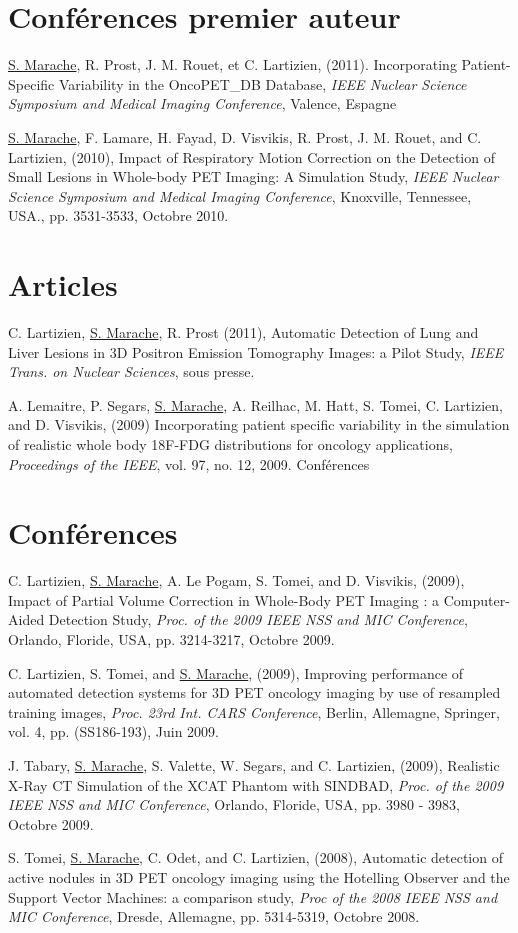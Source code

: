 
\section*{Conférences premier auteur}
\underline{S. Marache}, R. Prost, J. M. Rouet, et C. Lartizien, (2011). Incorporating Patient-Specific Variability in the OncoPET\_DB Database, \textit{IEEE Nuclear Science Symposium and Medical Imaging Conference}, Valence, Espagne 

\underline{S. Marache}, F. Lamare, H. Fayad, D. Visvikis, R. Prost, J. M. Rouet, and C. Lartizien, (2010), Impact of Respiratory Motion Correction on the Detection of Small Lesions in Whole-body PET Imaging: A Simulation Study, \textit{IEEE Nuclear Science Symposium and Medical Imaging Conference}, Knoxville, Tennessee, USA., pp. 3531-3533, Octobre 2010.

\section*{Articles}
C. Lartizien, \underline{S. Marache}, R. Prost (2011), Automatic Detection of Lung and Liver Lesions in 3D Positron Emission Tomography Images: a Pilot Study, \textit{IEEE Trans. on Nuclear Sciences}, sous presse.

A. Lemaitre, P. Segars, \underline{S. Marache}, A. Reilhac, M. Hatt, S. Tomei, C. Lartizien, and D. Visvikis, (2009) Incorporating patient specific variability in the simulation of realistic whole body 18F-FDG distributions for oncology applications, \textit{Proceedings of the IEEE}, vol. 97, no. 12, 2009.
Conférences

\section*{Conférences}
C. Lartizien, \underline{S. Marache}, A. Le Pogam, S. Tomei, and D. Visvikis, (2009), Impact of Partial Volume Correction in Whole-Body PET Imaging : a Computer-Aided Detection Study, \textit{Proc. of the 2009 IEEE NSS and MIC Conference}, Orlando, Floride, USA, pp. 3214-3217, Octobre 2009.

C. Lartizien, S. Tomei, and \underline{S. Marache}, (2009), Improving performance of automated detection systems for 3D PET oncology imaging by use of resampled training images, \textit{Proc. 23rd Int. CARS Conference}, Berlin, Allemagne, Springer, vol. 4, pp. (SS186-193), Juin 2009.

J. Tabary, \underline{S. Marache}, S. Valette, W. Segars, and C. Lartizien, (2009), Realistic X-Ray CT Simulation of the XCAT Phantom with SINDBAD, \textit{Proc. of the 2009 IEEE NSS and MIC Conference}, Orlando, Floride, USA, pp. 3980 - 3983, Octobre 2009.

S. Tomei, \underline{S. Marache}, C. Odet, and C. Lartizien, (2008), Automatic detection of active nodules in 3D PET oncology imaging using the Hotelling Observer and the Support Vector Machines: a comparison study, \textit{Proc of the 2008 IEEE NSS and MIC Conference}, Dresde, Allemagne, pp. 5314-5319, Octobre 2008.
